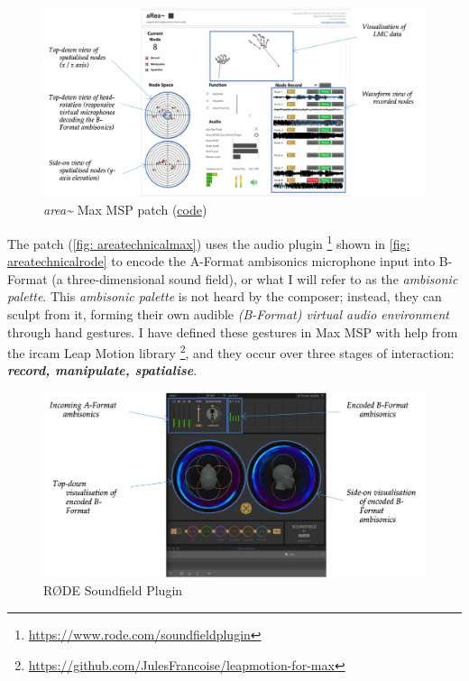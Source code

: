 \begin{figure}
    \centering
    \includegraphics[angle=90,height=0.95\textheight]{figures/05-area/areatechnical_max.png}
    \caption{\textit{area\textasciitilde{}} Max MSP patch (\href{https://github.com/sambilbow/area/tree/main/maxmsp}{code})}
    \label{fig: areatechnicalmax}
\end{figure}
The patch (\autoref{fig: areatechnicalmax}) uses the audio plugin \footnote{\url{https://www.rode.com/soundfieldplugin}} shown in \autoref{fig: areatechnicalrode} to encode the A-Format ambisonics microphone input into B-Format (a three-dimensional sound field), or what I will refer to as the \textit{ambisonic palette}. This \textit{ambisonic palette} is not heard by the composer; instead, they can sculpt from it, forming their own audible \textit{(B-Format) virtual audio environment} through hand gestures. I have defined these gestures in Max MSP with help from the \gls{ircam} Leap Motion library \citeyearpar{ircam2014} \footnote{\url{https://github.com/JulesFrancoise/leapmotion-for-max}}, and they occur over three stages of interaction: \textit{\textbf{record, manipulate, spatialise}}. 

\begin{figure}
    \centering
    \includegraphics[angle=90,height=0.75\textheight]{figures/05-area/areatechnical_rode.png}
    \caption{RØDE Soundfield Plugin}
    \label{fig: areatechnicalrode}
\end{figure}

